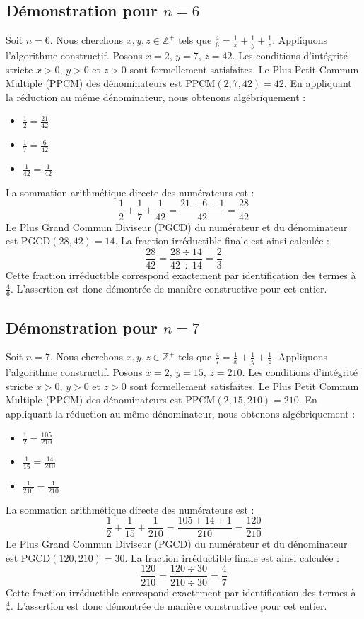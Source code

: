 \documentclass[11pt,a4paper]{article}
\begin{document}
\subsection{Démonstration pour $n = 6$}
Soit $n = 6$. Nous cherchons $x, y, z \in \mathbb{Z}^{+}$ tels que $\frac{4}{6} = \frac{1}{x} + \frac{1}{y} + \frac{1}{z}$.
Appliquons l'algorithme constructif. Posons $x = 2$, $y = 7$, $z = 42$.
Les conditions d'intégrité stricte $x > 0$, $y > 0$ et $z > 0$ sont formellement satisfaites.
Le Plus Petit Commun Multiple (PPCM) des dénominateurs est $\text{PPCM}(2, 7, 42) = 42$.
En appliquant la réduction au même dénominateur, nous obtenons algébriquement :
\begin{itemize}
    \item $\frac{1}{2} = \frac{21}{42}$
    \item $\frac{1}{7} = \frac{6}{42}$
    \item $\frac{1}{42} = \frac{1}{42}$
\end{itemize}
La sommation arithmétique directe des numérateurs est :
$$ \frac{1}{2} + \frac{1}{7} + \frac{1}{42} = \frac{21 + 6 + 1}{42} = \frac{28}{42} $$
Le Plus Grand Commun Diviseur (PGCD) du numérateur et du dénominateur est $\text{PGCD}(28, 42) = 14$.
La fraction irréductible finale est ainsi calculée :
$$ \frac{28}{42} = \frac{28 \div 14}{42 \div 14} = \frac{2}{3} $$
Cette fraction irréductible correspond exactement par identification des termes à $\frac{4}{6}$. L'assertion est donc démontrée de manière constructive pour cet entier.

\subsection{Démonstration pour $n = 7$}
Soit $n = 7$. Nous cherchons $x, y, z \in \mathbb{Z}^{+}$ tels que $\frac{4}{7} = \frac{1}{x} + \frac{1}{y} + \frac{1}{z}$.
Appliquons l'algorithme constructif. Posons $x = 2$, $y = 15$, $z = 210$.
Les conditions d'intégrité stricte $x > 0$, $y > 0$ et $z > 0$ sont formellement satisfaites.
Le Plus Petit Commun Multiple (PPCM) des dénominateurs est $\text{PPCM}(2, 15, 210) = 210$.
En appliquant la réduction au même dénominateur, nous obtenons algébriquement :
\begin{itemize}
    \item $\frac{1}{2} = \frac{105}{210}$
    \item $\frac{1}{15} = \frac{14}{210}$
    \item $\frac{1}{210} = \frac{1}{210}$
\end{itemize}
La sommation arithmétique directe des numérateurs est :
$$ \frac{1}{2} + \frac{1}{15} + \frac{1}{210} = \frac{105 + 14 + 1}{210} = \frac{120}{210} $$
Le Plus Grand Commun Diviseur (PGCD) du numérateur et du dénominateur est $\text{PGCD}(120, 210) = 30$.
La fraction irréductible finale est ainsi calculée :
$$ \frac{120}{210} = \frac{120 \div 30}{210 \div 30} = \frac{4}{7} $$
Cette fraction irréductible correspond exactement par identification des termes à $\frac{4}{7}$. L'assertion est donc démontrée de manière constructive pour cet entier.
\end{document}
